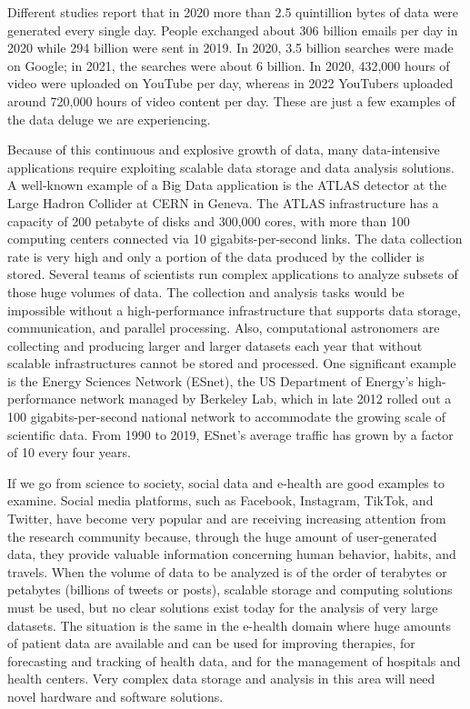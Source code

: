 Different studies report that in 2020 more than 2.5 quintillion bytes of data were generated every single day. People exchanged about 306 billion emails per day in 2020 while 294 billion were sent in 2019. In 2020, 3.5 billion searches were made on Google; in 2021, the searches were about 6 billion. In 2020, 432,000 hours of video were uploaded on YouTube per day, whereas in 2022 YouTubers uploaded around 720,000 hours of video content per day. These are just a few examples of the data deluge we are experiencing.

Because of this continuous and explosive growth of data, many data-intensive applications require exploiting scalable data storage and data analysis solutions. A well-known example of a Big Data application is the ATLAS detector at the Large Hadron Collider at CERN in Geneva. The ATLAS infrastructure has a capacity of 200 petabyte of disks and 300,000 cores, with more than 100 computing centers connected via 10 gigabits-per-second links. The data collection rate is very high and only a portion of the data produced\vadjust{\vspace*{-18pt}\pagebreak} by the collider is stored. Several teams of \hbox{scientists} run complex applications to analyze subsets of those huge volumes of data. The collection and analysis tasks would be impossible without a high-performance infrastructure that supports data storage, communication, and parallel processing. Also, computational astronomers are collecting and producing larger and larger datasets each year that without scalable infrastructures cannot be stored and processed. One significant example is the Energy Sciences Network (ESnet), the US Department of Energy's high-performance network managed by Berkeley Lab, which in late 2012 rolled out a 100 gigabits-per-second national network to accommodate the growing scale of scientific data. From 1990 to 2019, ESnet's average traffic has grown by a factor of 10 every four years.

If we go from science to society, social data and e-health are good examples to examine. Social media platforms, such as Facebook, Instagram, TikTok, and Twitter, have become very popular and are receiving increasing attention from the research community because, through the huge amount of user-generated data, they provide valuable information concerning human behavior, habits, and travels. When the volume of data to be analyzed is of the order of terabytes or petabytes (billions of tweets or posts), scalable storage and computing solutions must be used, but no clear solutions exist today for the analysis of very large datasets. The situation is the same in the e-health domain where huge amounts of patient data are available and can be used for improving therapies, for forecasting and tracking of health data, and for the management of hospitals and health centers. Very complex data storage and analysis in this area will need novel hardware and software solutions.


